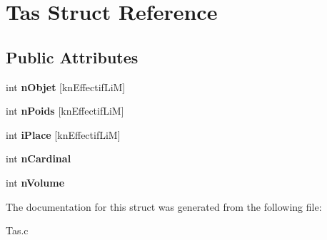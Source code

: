 \hypertarget{structTas}{}\section{Tas Struct Reference}
\label{structTas}
\subsection*{Public Attributes}
\begin{DoxyCompactItemize}
\item 
int {\bfseries n\+Objet} \mbox{[}kn\+Effectif\+LiM\mbox{]}\hypertarget{structTas_a459007c991c9587f50861f38a292498b}{}\label{structTas_a459007c991c9587f50861f38a292498b}

\item 
int {\bfseries n\+Poids} \mbox{[}kn\+Effectif\+LiM\mbox{]}\hypertarget{structTas_acb18094e9a1c6e05c990d2a3fe5a05e0}{}\label{structTas_acb18094e9a1c6e05c990d2a3fe5a05e0}

\item 
int {\bfseries i\+Place} \mbox{[}kn\+Effectif\+LiM\mbox{]}\hypertarget{structTas_a695d1d40cb19feabababac8125b4f6d7}{}\label{structTas_a695d1d40cb19feabababac8125b4f6d7}

\item 
int {\bfseries n\+Cardinal}\hypertarget{structTas_a529b2bb5b24a679eec99bf0990f5f112}{}\label{structTas_a529b2bb5b24a679eec99bf0990f5f112}

\item 
int {\bfseries n\+Volume}\hypertarget{structTas_ac838e1416affb6f5b11b8b6560a63b40}{}\label{structTas_ac838e1416affb6f5b11b8b6560a63b40}

\end{DoxyCompactItemize}


The documentation for this struct was generated from the following file\+:\begin{DoxyCompactItemize}
\item 
Tas.\+c\end{DoxyCompactItemize}
